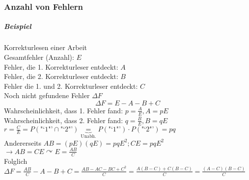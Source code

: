 \documentclass[a4paper]{scrartcl}
\begin{document}
\subsubsection{Anzahl von Fehlern}
\subparagraph{Beispiel} Korrekturlesen einer Arbeit\\
Gesamtfehler (Anzahl): $E$\\
Fehler, die 1. Korrekturleser entdeckt: $A$\\
Fehler, die 2. Korrekturleser entdeckt: $B$\\
Fehler die 1. und 2. Korrekturleser entdeckt: $C$\\
Noch nicht gefundene Fehler $\Delta F$
\[ \Delta F = E - A -B + C \]
Wahrscheinlichkeit, dass 1. Fehler fand: $p= \frac{A}{E} , A = pE$\\
Wahrscheinlichkeit, dass 2. Fehler fand: $q = \frac{B}{E}, B=qE$\\
$r=\frac{C}{E} = P(\text{"`1"'} \cap \text{"`2"'}) \underbrace{=}_{\text{Unabh.}} P(\text{"`1"'}) \cdot P(\text{"`2"'}) = pq$\\
Andererseits $AB = (pE) (qE) = pqE^2; CE = pqE^2$\\
$\rightarrow AB = CE \curvearrowright E = \frac{AB}{C}$\\
Folglich $\Delta F = \frac{AB}{C} - A - B + C = \frac{AB - AC - BC + C^2}{C} = \frac{A(B-C)+ C(B-C)}{C} = \frac{(A-C)(B-C)}{C}$
\end{document}
